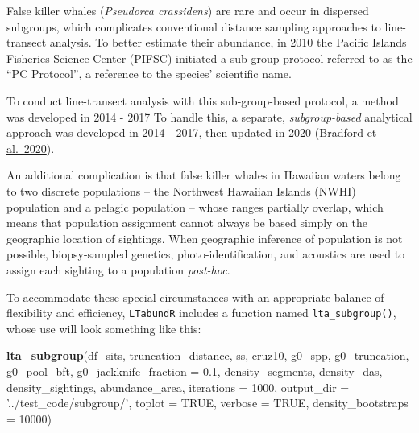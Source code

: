 \documentclass[
]{book}
\newenvironment{Shaded}{\begin{snugshade}}{\end{snugshade}}
\newcommand{\DataTypeTok}[1]{\textcolor[rgb]{0.13,0.29,0.53}{#1}}
\newcommand{\DecValTok}[1]{\textcolor[rgb]{0.00,0.00,0.81}{#1}}
\newcommand{\FloatTok}[1]{\textcolor[rgb]{0.00,0.00,0.81}{#1}}
\newcommand{\KeywordTok}[1]{\textcolor[rgb]{0.13,0.29,0.53}{\textbf{#1}}}
\newcommand{\NormalTok}[1]{#1}
\newcommand{\OtherTok}[1]{\textcolor[rgb]{0.56,0.35,0.01}{#1}}
\newcommand{\StringTok}[1]{\textcolor[rgb]{0.31,0.60,0.02}{#1}}
\begin{document}
False killer whales (\emph{Pseudorca crassidens}) are rare and occur in dispersed subgroups, which complicates conventional distance sampling approaches to line-transect analysis. To better estimate their abundance, in 2010 the Pacific Islands Fisheries Science Center (PIFSC) initiated a sub-group protocol referred to as the ``PC Protocol'', a reference to the species' scientific name.

To conduct line-transect analysis with this sub-group-based protocol, a method was developed in 2014 - 2017
To handle this, a separate, \emph{subgroup-based} analytical approach was developed in 2014 - 2017, then updated in 2020 (\href{https://www.fisheries.noaa.gov/inport/item/59592}{Bradford et al.~2020}).

An additional complication is that false killer whales in Hawaiian waters belong to two discrete populations -- the Northwest Hawaiian Islands (NWHI) population and a pelagic population -- whose ranges partially overlap, which means that population assignment cannot always be based simply on the geographic location of sightings. When geographic inference of population is not possible, biopsy-sampled genetics, photo-identification, and acoustics are used to assign each sighting to a population \emph{post-hoc}.

To accommodate these special circumstances with an appropriate balance of flexibility and efficiency, \texttt{LTabundR} includes a function named \texttt{lta\_subgroup()}, whose use will look something like this:

\begin{Shaded}
\begin{Highlighting}[]
\KeywordTok{lta_subgroup}\NormalTok{(df_sits,}
\NormalTok{             truncation_distance,}
\NormalTok{             ss,}
\NormalTok{             cruz10,}
\NormalTok{             g0_spp,}
\NormalTok{             g0_truncation,}
\NormalTok{             g0_pool_bft,}
             \DataTypeTok{g0_jackknife_fraction =} \FloatTok{0.1}\NormalTok{,}
\NormalTok{             density_segments,}
\NormalTok{             density_das,}
\NormalTok{             density_sightings,}
\NormalTok{             abundance_area,}
             \DataTypeTok{iterations =} \DecValTok{1000}\NormalTok{,}
             \DataTypeTok{output_dir =} \StringTok{'../test_code/subgroup/'}\NormalTok{,}
             \DataTypeTok{toplot =} \OtherTok{TRUE}\NormalTok{,}
             \DataTypeTok{verbose =} \OtherTok{TRUE}\NormalTok{,}
             \DataTypeTok{density_bootstraps =} \DecValTok{10000}\NormalTok{)}
\end{Highlighting}
\end{Shaded}
\end{document}
